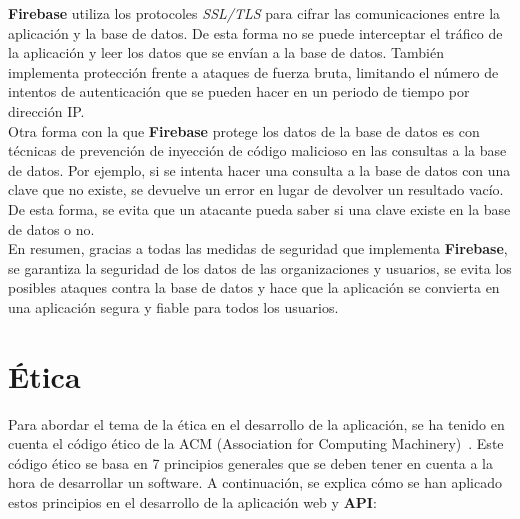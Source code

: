 \textbf{Firebase} utiliza los protocoles \textit{SSL/TLS} para cifrar las comunicaciones entre la aplicación y la base de datos. De
esta forma no se puede interceptar el tráfico de la aplicación y leer los datos que se envían a la base de datos. También
implementa protección frente a ataques de fuerza bruta, limitando el número de intentos de autenticación que se pueden hacer
en un periodo de tiempo por dirección IP. \\

Otra forma con la que \textbf{Firebase} protege los datos de la base de datos es con técnicas de prevención de inyección
de código malicioso en las consultas a la base de datos. Por ejemplo, si se intenta hacer una consulta a la base de datos
con una clave que no existe, se devuelve un error en lugar de devolver un resultado vacío. De esta forma, se evita que
un atacante pueda saber si una clave existe en la base de datos o no. \\

En resumen, gracias a todas las medidas de seguridad que implementa \textbf{Firebase}, se garantiza la seguridad de los
datos de las organizaciones y usuarios, se evita los posibles ataques contra la base de datos y hace que la aplicación
se convierta en una aplicación segura y fiable para todos los usuarios.

\section{Ética}\label{sec:etica}

Para abordar el tema de la ética en el desarrollo de la aplicación, se ha tenido en cuenta el código ético de la ACM (Association
for Computing Machinery)~\cite{acm-code-of-ethics}. Este código ético se basa en 7 principios generales que se deben tener en cuenta
a la hora de desarrollar un software. A continuación, se explica cómo se han aplicado estos principios en el desarrollo
de la aplicación web y \textbf{API}:

